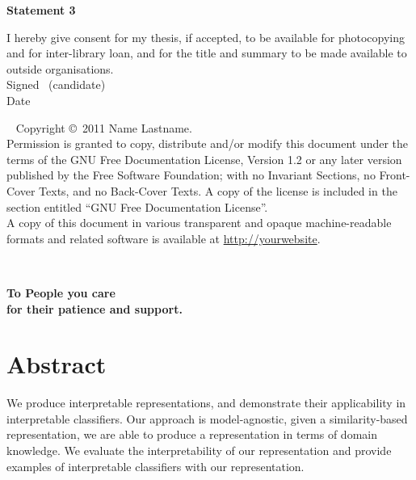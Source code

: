 \documentclass[a4paper,oneside,onecolumn,openright,12pt]{book}
\def\baselinestretch{1.5}
\begin{document}
\vfill

\textbf{\large Statement 3}

I hereby give consent for my thesis, if accepted, to be available for photocopying and for inter-library loan,
 and for the title and summary to be made available to outside organisations.\\[2ex]
Signed \dotfill \ (candidate) \hspace*{10em}\\[1ex]
Date\ \ \ \ \ \dotfill \hspace*{18em}

\vfill

\cleardoublepage

\thispagestyle{plain}
\ \vfill{\small
Copyright \copyright\ 2011 Name Lastname.\\
Permission is granted to copy, distribute and/or modify this document
under the terms of the GNU Free Documentation License, Version 1.2 or
any later version published by the Free Software Foundation; with no
Invariant Sections, no Front-Cover Texts, and no Back-Cover Texts. A
copy of the license is included in the section entitled ``GNU Free
Documentation License''.}\\[3.5ex]
A copy of this document in various transparent and opaque
machine-readable formats and related software is available at
\url{http://yourwebsite}.
\cleardoublepage


\ \vspace*{1.11cm}
\begin{flushright}
\textbf{\large To People you care}\\
\textbf{\large for their patience and support.}
\end{flushright}
\newpage
\markboth{}{}
\cleardoublepage


\chapter*{Abstract}

We produce interpretable representations, and demonstrate their applicability in interpretable classifiers. Our approach is model-agnostic, given a similarity-based representation, we are able to produce a representation in terms of domain knowledge. We evaluate the interpretability of our representation and provide examples of interpretable classifiers with our representation.

\def\baselinestretch{1.5}\normalfont
\end{document}
